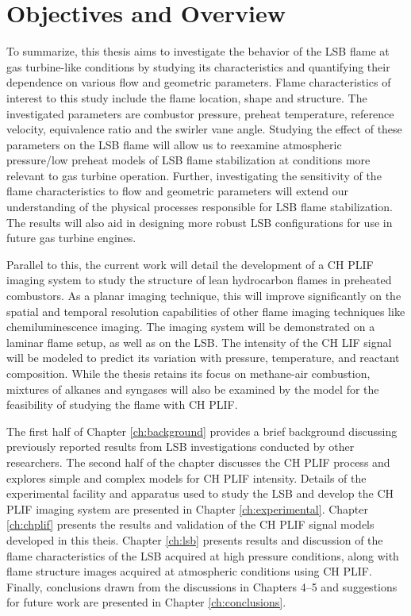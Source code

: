 \section{Objectives and Overview}

To summarize, this thesis aims to investigate the behavior of the LSB flame at gas turbine-like conditions by studying its characteristics and quantifying their dependence on various flow and geometric parameters.
Flame characteristics of interest to this study include the flame location, shape and structure.
The investigated parameters are combustor pressure, preheat temperature, reference velocity, equivalence ratio and the swirler vane angle.
Studying the effect of these parameters on the LSB flame will allow us to reexamine atmospheric pressure/low preheat models of LSB flame stabilization at conditions more relevant to gas turbine operation.
Further, investigating the sensitivity of the flame characteristics to flow and geometric parameters will extend our understanding of the physical processes responsible for LSB flame stabilization.
The results will also aid in designing more robust LSB configurations for use in future gas turbine engines.

Parallel to this, the current work will detail the development of a CH PLIF imaging system to study the structure of lean hydrocarbon flames in preheated combustors.
As a planar imaging technique, this will improve significantly on the spatial and temporal resolution capabilities of other flame imaging techniques like chemiluminescence imaging.
The imaging system will be demonstrated on a laminar flame setup, as well as on the LSB.
The intensity of the CH LIF signal will be modeled to predict its variation with pressure, temperature, and reactant composition.
While the thesis retains its focus on methane-air combustion, mixtures of alkanes and syngases will also be examined by the model for the feasibility of studying the flame with CH PLIF.

The first half of Chapter \ref{ch:background} provides a brief background discussing previously reported results from LSB investigations conducted by other researchers.
The second half of the chapter discusses the CH PLIF process and explores simple and complex models for CH PLIF intensity.
Details of the experimental facility and apparatus used to study the LSB and develop the CH PLIF imaging system are presented in Chapter \ref{ch:experimental}.
Chapter \ref{ch:chplif} presents the results and validation of the CH PLIF signal models developed in this theis.
Chapter \ref{ch:lsb} presents results and discussion of the flame characteristics of the LSB acquired at high pressure conditions, along with flame structure images acquired at atmospheric conditions using CH PLIF.
Finally, conclusions drawn from the discussions in Chapters 4--5 and suggestions for future work are presented in Chapter \ref{ch:conclusions}.

